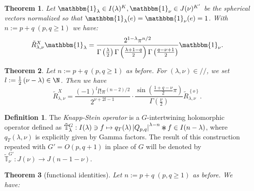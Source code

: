 \documentclass[portrait,final,paperwidth=90cm,paperheight=120cm,fontscale=0.3]{baposter}
\newcommand{\Conv}{\mathop{\scalebox{1.5}{\raisebox{-0.2ex}{$\ast$}}}}
\newtheorem{theorem}{Theorem}
\newcommand{\Hom}{\mbox{\normalfont Hom}}
\newcommand{\Sol}{\mathcal{S}\!{\it ol}}
\theoremstyle{definition}
\newtheorem{definition}{Definition}
\renewcommand{\Q}{Q_{p,q}}
\begin{document}
\begin{poster}
{%
}
{
\begin{theorem}\label{thm:spherical}
	Let $\mathbbm{1}_\lambda\in I(\lambda)^K,\mathbbm{1}_\nu\in J(\nu)^{K'}$ be the spherical vectors normalized so that $\mathbbm{1}_\lambda(e)=\mathbbm{1}_\nu(e)=1$.
	With $n:=p+q\;(p,q\ge1)$ we have:
\[ \tilde{R}^X_{\lambda, \nu} \mathbbm{1}_{\lambda} =  \frac{2^{1 -
\lambda}\pi^{n / 2}}{\Gamma \left( \frac{\lambda}{2} \right)
\Gamma \left(  \frac{\lambda + 1-q}{2} \right) \Gamma \left(
\frac{q - \nu + 1}{2} \right)} \mathbbm{1}_{\nu}. \]
\end{theorem}
}
{
\begin{theorem}
	Let $n:=p+q\;(p,q\ge1)$ as before.
	For $(\lambda,\nu)\in//$, we set $l:=\frac{1}{2}\left( \nu-\lambda \right)\in\N$. Then we have
  \[\tilde{R}_{\lambda,\nu}^X  = \frac{ (- 1)^l l!\pi^{(n - 2) / 2} 
		}{2^{ \nu + 2 l-1}}\cdot  \frac{\sin\left( \frac{1+q-\nu}{2}\pi \right)}{\Gamma\left( \frac{\nu}{2} \right)}
	\tilde{R}_{\lambda,\nu}^{ \left\{ o \right\} }.\]
	\end{theorem}
}
{
	\begin{definition}
		The {\it Knapp-Stein operator} is a $G$-intertwining holomorphic operator defined as
		$\tilde{\mathbb{T}}_{\lambda}^G:I(\lambda)\ni f\mapsto q_T(\lambda)\myabs{\Q}^{\lambda-n}\Conv f\in I(n-\lambda)$, where $q_T(\lambda,\nu)$ is explicitly given by Gamma factors.
		The result of this construction repeated with $G'=O(p,q+1)$ in place of $G$ will be denoted by $\tilde{\mathbb{T}}^{G'}_\nu:J(\nu)\to J(n-1-\nu)$.
	\end{definition}
	\begin{theorem}[functional identities]
		Let $n:=p+q\;(p,q\ge1)$ as before.
		We have:
\begin{eqnarray}

\end{eqnarray}
\end{theorem}}
\end{poster}
\end{document}
